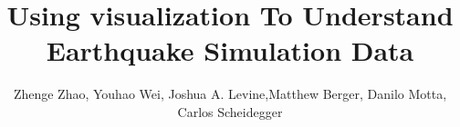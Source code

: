 \documentclass[journal]{vgtc}                %
\title{Using visualization To Understand  Earthquake Simulation Data}
\author{Zhenge Zhao, Youhao Wei, Joshua A. Levine,Matthew Berger, Danilo Motta, Carlos Scheidegger}
\begin{document}



\label{sec:myintro}
\maketitle



%





%

%



%


\end{document}
